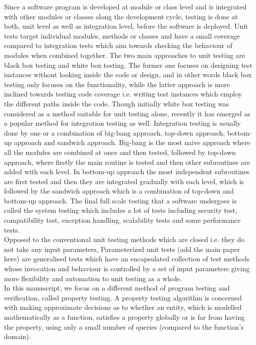 Since a software program is developed at module or class level and is integrated with other modules or classes along the development cycle, testing is done at both, unit level as well as integration level, before the software is deployed. Unit tests target individual modules, methods or classes and have a small coverage compared to integration tests which aim towards checking the behaviour of modules when combined together. The two main approaches to unit testing are black box testing and white box testing. The former one focuses on designing test instances without looking inside the code or design, and in other words black box testing only focuses on the functionality, while the latter approach is more inclined towards testing code coverage i.e. writing test instances which employ the different paths inside the code. Though initially white box testing was considered as a method suitable for unit testing alone, recently it has emerged as a popular method for integration testing as well. Integration testing is usually done by one or a combination of big-bang approach, top-down approach, bottom-up approach and sandwich approach. Big-bang is the most naive approach where all the modules are combined at once and then tested, followed by top-down approach, where firstly the main routine is tested and then other subroutines are added with each level. In bottom-up approach the most independent subroutines are first tested and then they are integrated gradually with each level, which is followed by the sandwich approach which is a combination of top-down and bottom-up approach. The final full scale testing that a software undergoes is called the system testing which includes a lot of tests including security test, compatibility test, exception handling, scalability tests and some performance tests. \\

Opposed to the conventional unit testing methods which are closed i.e. they do not take any input parameters, Parameterized unit tests (add the main paper here) %
are generalised tests which have an encapsulated collection of test methods whose invocation and behaviour is controlled by a set of input parameters giving more flexibility and automation to unit testing as a whole. \\

In this manuscript, we focus on a different method of program testing and verification, called property testing. A property testing algorithm is concerned with making approximate decisions as to whether an entity, which is modelled mathematically as a function, satisfies a property globally or is far from having the property, using only a small number of queries (compared to the function's domain).\\
